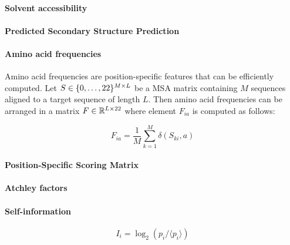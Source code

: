         \paragraph{Solvent accessibility}


        \paragraph{Predicted Secondary Structure Prediction}

        \paragraph{Amino acid frequencies}

            Amino acid frequencies are position-specific features that can be efficiently computed.
            Let $S \in \{0, \ldots, 22\}^{M \times L}$ be a 
            MSA matrix containing $M$ sequences aligned to a target
            sequence of length $L$. Then amino acid frequencies can be arranged
            in a matrix $F \in \mathbb{R}^{L \times 22}$
            where element $F_{ia}$ is computed as follows:

            \begin{equation}
                F_{ia} = \frac{1}{M} \sum\limits_{k=1}^M \delta(S_{ki}, a)
            \end{equation}

        \paragraph{Position-Specific Scoring Matrix}

        \paragraph{Atchley factors}


        \paragraph{Self-information}

            \cite{Michel383133}

            \begin{equation}
                I_i = \log_2 (p_i / \langle p_i \rangle)
            \end{equation}

